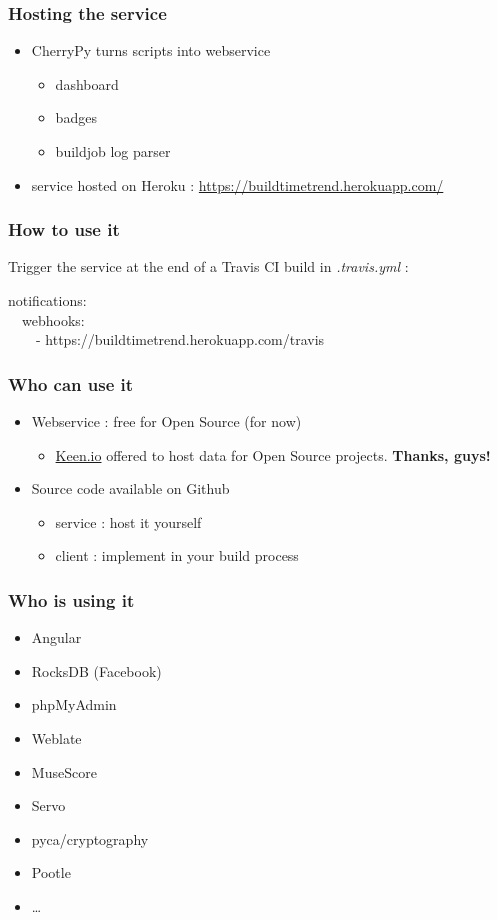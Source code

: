 \documentclass[14pt]{beamer}
\begin{document}
  \begin{frame}
    \frametitle{Hosting the service}
    \begin{itemize}
      \item CherryPy turns scripts into webservice
        \begin{itemize}
          \item dashboard
          \item badges
          \item buildjob log parser
        \end{itemize}
      \item service hosted on Heroku : \href{https://buildtimetrend.herokuapp.com/}{https://buildtimetrend.herokuapp.com/}
    \end{itemize}
  \end{frame}
  \begin{frame}
    \frametitle{How to use it}
    Trigger the service at the end of a Travis CI build in \textit{.travis.yml} :
    \begin{example}
      \small{notifications:\\
      \ \ webhooks:\\
      \ \ \ \ - https://buildtimetrend.herokuapp.com/travis}
    \end{example}
  \end{frame}
  \begin{frame}
    \frametitle{Who can use it}
    \begin{itemize}
      \item Webservice : free for Open Source (for now)
      \begin{itemize}
        \item \href{https://keen.io}{Keen.io} offered to host data for Open Source projects. \textbf{Thanks, guys!}
      \end{itemize}
      \item Source code available on Github
      \begin{itemize}
        \item service : host it yourself
        \item client : implement in your build process
      \end{itemize}
    \end{itemize}
  \end{frame}
  \begin{frame}
    \frametitle{Who is using it}
    \begin{itemize}
      \item Angular
      \item RocksDB (Facebook)
      \item phpMyAdmin
      \item Weblate
      \item MuseScore
      \item Servo
      \item pyca/cryptography
      \item Pootle
      \item \ldots
    \end{itemize}
  \end{frame}
\end{document}
